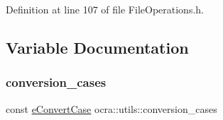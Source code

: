 Definition at line 107 of file File\+Operations.\+h.



\subsection{Variable Documentation}
\hypertarget{namespaceocra_1_1utils_a4775079ee4f9f6c7620af882e8092c62}{}\label{namespaceocra_1_1utils_a4775079ee4f9f6c7620af882e8092c62} 
\subsubsection{\texorpdfstring{conversion\+\_\+cases}{conversion\_cases}}
{\footnotesize\ttfamily const \hyperlink{namespaceocra_1_1utils_1_1details_a617d399055aa54cfdf2d3199ca91c399}{e\+Convert\+Case} ocra\+::utils\+::conversion\+\_\+cases}

